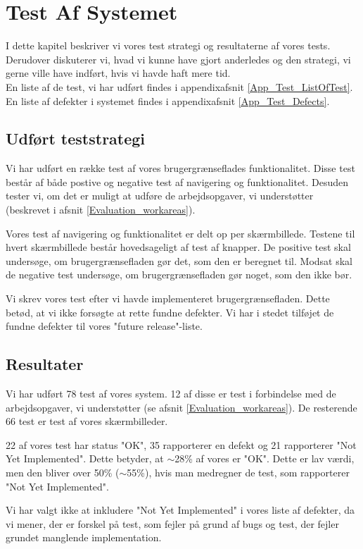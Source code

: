 \chapter{Test Af Systemet}
\label{Test}
I dette kapitel beskriver vi vores test strategi og resultaterne af vores tests. Derudover diskuterer vi, hvad vi kunne have gjort anderledes og den strategi, vi gerne ville have indført, hvis vi havde haft mere tid.
\\En liste af de test, vi har udført findes i appendixafsnit \ref{App_Test_ListOfTest}. En liste af defekter i systemet findes i appendixafsnit \ref{App_Test_Defects}.

\section{Udført teststrategi}
\label{Test_strat}
Vi har udført en række test af vores brugergrænseflades funktionalitet. Disse test består af både postive og negative test af navigering og funktionalitet. Desuden tester vi, om det er muligt at udføre de arbejdsopgaver, vi understøtter (beskrevet i afsnit \ref{Evaluation_workareas}).

Vores test af navigering og funktionalitet er delt op per skærmbillede. Testene til hvert skærmbillede består hovedsageligt af test af knapper. De positive test skal undersøge, om brugergrænsefladen gør det, som den er beregnet til. Modsat skal de negative test undersøge, om brugergrænsefladen gør noget, som den ikke bør.

Vi skrev vores test efter vi havde implementeret brugergrænsefladen. Dette betød, at vi ikke forsøgte at rette fundne defekter. Vi har i stedet  tilføjet de fundne defekter til vores "future release"-liste.

\section{Resultater}
\label{Test_Results}
Vi har udført 78 test af vores system. 12 af disse er test i forbindelse med de arbejdsopgaver, vi understøtter (se afsnit \ref{Evaluation_workareas}). De resterende 66 test er test af vores skærmbilleder.

22 af vores test har status "OK", 35 rapporterer en defekt og 21 rapporterer "Not Yet Implemented". Dette betyder, at $\sim$28\% af vores er "OK". Dette er lav værdi, men den bliver over 50\% ($\sim$55\%), hvis man medregner de test, som rapporterer "Not Yet Implemented". 

Vi har valgt ikke at inkludere "Not Yet Implemented" i vores liste af defekter, da vi mener, der er forskel på test, som fejler på grund af bugs og test, der fejler grundet manglende implementation. 

